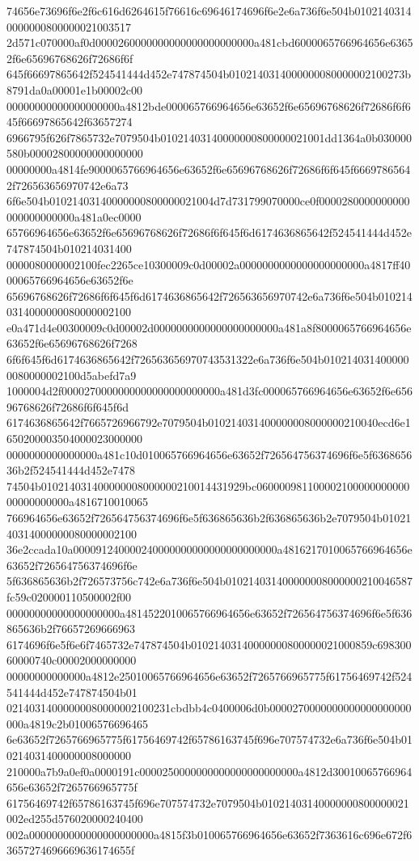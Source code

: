 {74656e73696f6e2f6c616d6264615f76616c69646174696f6e2e6a736f6e504b01021403140000000800000021003517
2d571c070000af0d0000260000000000000000000000a481cbd6000065766964656e63652f6e65696768626f72686f6f
645f66697865642f524541444d452e747874504b0102140314000000080000002100273b8791da0a00001e1b00002c00
00000000000000000000a4812bde000065766964656e63652f6e65696768626f72686f6f645f66697865642f63657274
6966795f626f7865732e7079504b01021403140000000800000021001dd1364a0b030000580b00002800000000000000
00000000a4814fe9000065766964656e63652f6e65696768626f72686f6f645f66697865642f726563656970742e6a73
6f6e504b01021403140000000800000021004d7d731799070000ce0f0000280000000000000000000000a481a0ec0000
65766964656e63652f6e65696768626f72686f6f645f6d6174636865642f524541444d452e747874504b010214031400
0000080000002100fec2265ce10300009c0d00002a0000000000000000000000a4817ff4000065766964656e63652f6e
65696768626f72686f6f645f6d6174636865642f726563656970742e6a736f6e504b0102140314000000080000002100
e0a471d4e00300009c0d00002d0000000000000000000000a481a8f8000065766964656e63652f6e65696768626f7268
6f6f645f6d6174636865642f726563656970743531322e6a736f6e504b0102140314000000080000002100d5abefd7a9
1000004d2f0000270000000000000000000000a481d3fc000065766964656e63652f6e65696768626f72686f6f645f6d
6174636865642f7665726966792e7079504b010214031400000008000000210040ecd6e1650200003504000023000000
0000000000000000a481c10d010065766964656e63652f726564756374696f6e5f636865636b2f524541444d452e7478
74504b010214031400000008000000210014431929bc06000098110000210000000000000000000000a4816710010065
766964656e63652f726564756374696f6e5f636865636b2f636865636b2e7079504b0102140314000000080000002100
36e2ccada10a000091240000240000000000000000000000a4816217010065766964656e63652f726564756374696f6e
5f636865636b2f726573756c742e6a736f6e504b010214031400000008000000210046587fc59c020000110500002f00
00000000000000000000a4814522010065766964656e63652f726564756374696f6e5f636865636b2f76657269666963
6174696f6e5f6e6f7465732e747874504b01021403140000000800000021000859c69830060000740c00002000000000
00000000000000a4812e25010065766964656e63652f7265766965775f61756469742f524541444d452e747874504b01
02140314000000080000002100231cbdbb4c0400006d0b0000270000000000000000000000a4819c2b01006576696465
6e63652f7265766965775f61756469742f65786163745f696e707574732e6a736f6e504b010214031400000008000000
210000a7b9a0ef0a0000191c0000250000000000000000000000a4812d30010065766964656e63652f7265766965775f
61756469742f65786163745f696e707574732e7079504b01021403140000000800000021002ed255d576020000240400
002a0000000000000000000000a4815f3b010065766964656e63652f7363616c696e672f63657274696669636174655f
}
